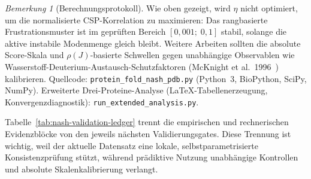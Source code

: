 \documentclass[12pt,a4paper]{article}
\theoremstyle{remark}
\newtheorem{remark}{Bemerkung}
\begin{document}
\begin{remark}[Berechnungsprotokoll]
Wie oben gezeigt, wird $\eta$ nicht optimiert, um die normalisierte CSP-Korrelation zu maximieren: Das rangbasierte Frustrationsmuster ist im geprüften Bereich $[0{,}001;\; 0{,}1]$ stabil, solange die aktive instabile Modenmenge gleich bleibt. Weitere Arbeiten sollten die absolute Score-Skala und $\rho(J)$-basierte Schwellen gegen unabhängige Observablen wie Wasserstoff-Deuterium-Austausch-Schutzfaktoren (McKnight et al.\ 1996~\cite{McKnight1996}) kalibrieren.
Quellcode: \texttt{protein\_fold\_nash\_pdb.py} (Python~3, BioPython, SciPy, NumPy).
Erweiterte Drei-Proteine-Analyse (LaTeX-Tabellenerzeugung, Konvergenzdiagnostik): \texttt{run\_extended\_analysis.py}.
\end{remark}

Tabelle~\ref{tab:nash-validation-ledger} trennt die empirischen und rechnerischen Evidenzblöcke von den jeweils nächsten Validierungsgates. Diese Trennung ist wichtig, weil der aktuelle Datensatz eine lokale, selbstparametrisierte Konsistenzprüfung stützt, während prädiktive Nutzung unabhängige Kontrollen und absolute Skalenkalibrierung verlangt.
\end{document}
